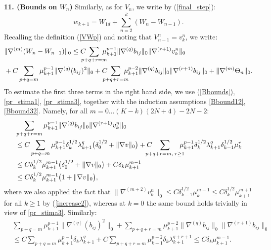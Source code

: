 \documentclass[reqno,twoside,11pt]{amsart}
\numberwithin{equation}{section}
\theoremstyle{plain}
\theoremstyle{definition}
\begin{document}
{\bf 11. (Bounds on $W_n$)} Similarly, as for $V_n$, we write by (\ref{final_step}):
$$w_{k+1} = W_{1d} + \sum_{n=2}^{\bar d} (W_n-W_{n-1}).$$
Recalling the definition (\ref{VWp})  and noting that $V_{n-1}^n = v_k^n$, we write:
\begin{equation}\label{Wp_diff}
\begin{split}
& \|\nabla^{(m)}(W_n-W_{n-1})\|_0\leq  C \hspace{-3mm}
\sum_{p+q+r=m}  \hspace{-3mm}\mu_{k+1}^{p-1}\|\nabla^{(q)}b_{ij}\|_0
\|\nabla^{(r+1)}v_k^n\|_0 \\ & + C\sum_{p+q=m} \mu_{k+1}^{p-1}\|\nabla^{(q)}(b_{ij})^2\|_0
+ C  \hspace{-3mm}\sum_{p+q+r=m}  \hspace{-3mm}\mu_{k+1}^{p-2}\|\nabla^{(q)}b_{ij}\|_0
\|\nabla^{(r+1)}b_{ij}\|_0 + \|\nabla^{(m)}\Theta_n\|_0.
\end{split}
\end{equation}
To estimate the first three terms in the right hand side, we use
(\ref{Bbounds}), \ref{pr_stima1}, \ref{pr_stima3}, together with
the induction assumptions \ref{Bbound12}, \ref{Bbound32}. Namely, for
all $m=0\ldots (K-k)(2N+4)-2N-2$:
\begin{equation*}
\begin{split}
& \sum_{p+q+r=m} \mu_{k+1}^{p-1}\|\nabla^{(q)}b_{ij}\|_0
\|\nabla^{(r+1)}v_k^n\|_0 \\ & \leq C\sum_{p+q=m} \mu_{k+1}^{p-1}\delta_k^{1/2}\lambda_{k+1}^q
\big(\delta_0^{1/2}+\|\nabla v\|_0\big)
+ C \hspace{-4mm}\sum_{p+q+r=m,\; r\geq 1} 
\hspace{-3mm}\mu_{k+1}^{p-1}\delta_k^{1/2}\lambda_{k+1}^q \delta_{k-1}^{1/2}\mu_k^r
\\ & \leq C \delta_k^{1/2}\mu_{k+1}^{m-1}\big(\delta_0^{1/2}+\|\nabla v\|_0\big) 
+ C \delta_k \mu_{k+1}^{m-1}
\\ & \leq C \delta_k^{1/2}\mu_{k+1}^{m-1}\big(1+\|\nabla v\|_0\big), 
\end{split}
\end{equation*}
where we also applied the fact that $\|\nabla^{(m+2)}v_k^n\|_0 \leq C
\delta_{k-1}^{1/2}\mu_k^{m+1} \leq C\delta_{k}^{1/2}\mu_{k+1}^{m+1}$
for all $k\geq 1$ by (\ref{increase2}), 
whereas at $k=0$ the same bound holds trivially in view of \ref{pr_stima3}.
Similarly:
\begin{equation*}
\begin{split}
& \sum_{p+q=m} \mu_{k+1}^{p-1}\|\nabla^{(q)}(b_{ij})^2\|_0
+ \sum_{p+q+r=m} \mu_{k+1}^{p-2}\|\nabla^{(q)}b_{ij}\|_0 
\|\nabla^{(r+1)}b_{ij}\|_0 \\ & \leq C \sum_{p+q=m}
\mu_{k+1}^{p-1}\delta_k\lambda_{k+1}^q + C \sum_{p+q+r=m}
\mu_{k+1}^{p-2}\delta_k\lambda_{k+1}^{q+r+1}\leq C\delta_k\mu_{k+1}^{m-1}.
\end{split}
\end{equation*}
\end{document}
